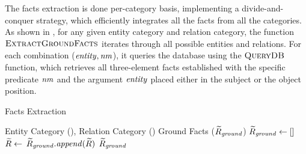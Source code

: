 The facts extraction is done per-category basis, implementing a divide-and-conquer strategy, which efficiently integrates all the facts from all the categories. 
As shown in , for any given entity category and relation category, the function $\textsc{ExtractGroundFacts}$ iterates through all possible entities and relations. 
For each combination ($\mathit{entity}, \mathit{nm}$), it queries the database using the $\textsc{QueryDB}$ function, which retrieves all three-element facts established with the specific predicate $\nm$ and the argument $\mathit{entity}$ placed either in the subject or the object position. 

{
\begin{algorithm}[!h]
\caption{Facts Extraction}
\label{alg:ground_truth}
\small
\begin{algorithmic}[1]
\Require  
Entity Category (\entityCat), Relation Category (\relationCat)
\Ensure Ground Facts ($\widetilde{R}_{\mathit{ground}}$)
\State$\widetilde{R}_{\mathit{ground}} \gets []$ 
 
\For{~$\nm$ $\in$  \relationCat~} 
\State $\widetilde{R} \gets$  
\State $\widetilde{R}_{\mathit{ground}}.\mathit{append}(\widetilde{R})$ 
\EndFor
\EndFor
\State \Return $\widetilde{R}_{\mathit{ground}}$ 
\EndFunction
\end{algorithmic}
\end{algorithm}
}



